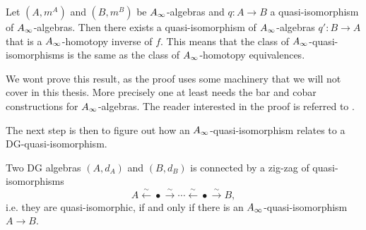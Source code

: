 \begin{proposition}
Let $(A, m^A)$ and $(B, m^B)$ be $A_{\infty}$-algebras and $q:A\rightarrow B$ a quasi-isomorphism of $A_{\infty}$-algebras. Then there exists a quasi-isomorphism of $A_{\infty}$-algebras $q':B\rightarrow A$ that is a $A_{\infty}$-homotopy inverse of $f$. This means that the class of $A_{\infty}$-quasi-isomorphisms is the same as the class of $A_{\infty}$-homotopy equivalences. 
\label{prop:infty-q.i._are_homotopy_invertible}
\end{proposition}

We wont prove this result, as the proof uses some machinery that we will not cover in this thesis. More precisely one at least needs the bar and cobar constructions for $A_{\infty}$-algebras. The reader interested in the proof is referred to \cite[Corollary 1.3.1.3]{french1}. 

The next step is then to figure out how an $A_{\infty}$-quasi-isomorphism relates to a DG-quasi-isomorphism. 

\begin{corollary}
Two DG algebras $(A, d_A)$ and $(B, d_B)$ is connected by a zig-zag of quasi-isomorphisms
\begin{equation*}
    A \overset{\sim}\longleftarrow \bullet \overset{\sim}\longrightarrow \cdots \overset{\sim}\longleftarrow \bullet \overset{\sim}\longrightarrow B, 
\end{equation*}
i.e. they are quasi-isomorphic, if and only if there is an $A_{\infty}$-quasi-isomorphism $A\rightarrow B$. 
\label{lem:zigzag-quasi}
\end{corollary}


